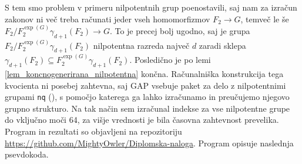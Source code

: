 S tem smo problem v primeru nilpotentnih grup poenostavili, saj nam za izračun zakonov ni več treba računati jeder vseh homomorfizmov $F_2 \to G$, temveč le še $F_2 / F_2^{\exp(G)}\gamma_{d+1}(F_2) \to G$.
To je precej bolj ugodno, saj je grupa $F_2 / F_2^{\exp(G)}\gamma_{d+1}(F_2)$ nilpotentna razreda največ $d$ zaradi sklepa $\gamma_{d+1}(F_2) \subseteq  F_2^{\exp(G)}\gamma_{d+1}(F_2)$.
Posledično je po lemi \ref{lem_koncnogenerirana_nilpotentna} končna.
Računalniška konstrukcija tega kvocienta ni posebej zahtevna, saj GAP vsebuje paket za delo z nilpotentnimi grupami \texttt{nq} (\cite{nq2.5.11}), s pomočjo katerega ga lahko izračunamo in preučujemo njegovo grupno strukturo.
Na tak način sem izračunal indekse za vse nilpotentne grupe do vključno moči 64, za višje vrednosti je bila časovna zahtevnost prevelika. Program in rezultati so objavljeni na repozitoriju \url{https://github.com/MightyOwler/Diplomska-naloga}.
Program opisuje naslednja psevdokoda. 

